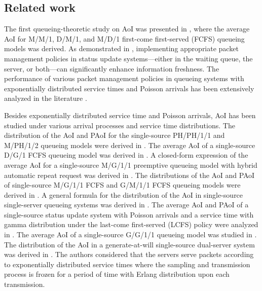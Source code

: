 \documentclass[conference]{IEEEtran}
\begin{document}
 

\subsection{Related work}
The first queueing-theoretic study on AoI was presented in \cite{6195689}, where the average AoI for M/M/1, D/M/1, and M/D/1 first-come first-served (FCFS) queueing models was derived. 
As demonstrated in \cite{6310931,7415972}, implementing appropriate packet management policies in status update systems—either in the waiting queue, the server, or both—can significantly enhance information freshness.
The performance of various packet management policies in queueing systems with exponentially distributed service times and Poisson arrivals has been extensively analyzed in the literature \cite{8469047,8437591,8406966,8437907,9013935,9048914,9252168,9162681,Moltafet2020mgf,9611498,9705518}.


Besides exponentially distributed service time and Poisson arrivals, AoI has been studied under various arrival processes and service time distributions. 
 The distribution of the AoI and PAoI for the single-source PH/PH/1/1 and M/PH/1/2 queueing models were derived in \cite{9119460}.
The average AoI of a single-source D/G/1 FCFS  queueing model was derived in \cite{8406909}. A closed-form expression of the average AoI for a single-source  M/G/1/1 preemptive queueing model with hybrid automatic repeat request was derived in \cite{8006504}. The distributions of the AoI and PAoI of single-source  M/G/1/1 FCFS and G/M/1/1 FCFS queueing models were derived in \cite{8006592}.
A general formula for the distribution of the AoI in single-source single-server queueing systems was derived in \cite{8820073}. 
The average AoI and PAoI of a single-source status update system with Poisson arrivals and a service time with gamma distribution under the last-come first-served (LCFS) policy were analyzed in \cite{7541764}. 
The average AoI of a single-source G/G/1/1 queueing model was studied in \cite{9048933}. 
The distribution of the AoI in a generate-at-will single-source dual-server system was derived in \cite{Arxakar2024age}. The authors considered that the servers serve packets according to exponentially distributed service times where the sampling and transmission process is frozen for a period of time with  Erlang distribution upon each transmission.
\end{document}
